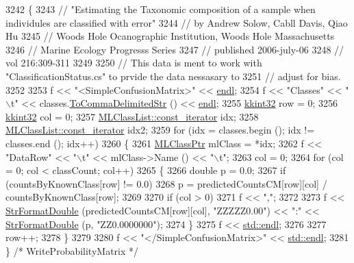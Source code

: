 \begin{DoxyCode}
3242 \{
3243   \textcolor{comment}{// "Estimating the Taxonomic composition of a sample when individules are classified with error"}
3244   \textcolor{comment}{// by Andrew Solow, Cabll Davis, Qiao Hu}
3245   \textcolor{comment}{// Woods Hole Ocanographic Institution, Woods Hole Massachusetts}
3246   \textcolor{comment}{// Marine Ecology Progresss Series}
3247   \textcolor{comment}{// published 2006-july-06}
3248   \textcolor{comment}{// vol 216:309-311}
3249   
3250   \textcolor{comment}{// This data is ment to work with "ClassificationStatus.cs" to prvide the data nessasary to }
3251   \textcolor{comment}{// adjust for bias.}
3252 
3253   f << \textcolor{stringliteral}{"<SimpleConfusionMatrix>"} << \hyperlink{namespace_k_k_b_ad1f50f65af6adc8fa9e6f62d007818a8}{endl};
3254   f << \textcolor{stringliteral}{"Classes"}      << \textcolor{stringliteral}{"\(\backslash\)t"} << classes.\hyperlink{class_k_k_m_l_l_1_1_m_l_class_list_a2842ee0f0a658c29988b02bf5cbe19d7}{ToCommaDelimitedStr} () << 
      \hyperlink{namespace_k_k_b_ad1f50f65af6adc8fa9e6f62d007818a8}{endl};
3255   \hyperlink{namespace_k_k_b_a8fa4952cc84fda1de4bec1fbdd8d5b1b}{kkint32}  row = 0;
3256   \hyperlink{namespace_k_k_b_a8fa4952cc84fda1de4bec1fbdd8d5b1b}{kkint32}  col = 0;
3257   \hyperlink{class_k_k_b_1_1_k_k_queue_aeb057c9c010446f46f57c1e355f981f1}{MLClassList::const\_iterator}  idx;
3258   \hyperlink{class_k_k_b_1_1_k_k_queue_aeb057c9c010446f46f57c1e355f981f1}{MLClassList::const\_iterator}  idx2;
3259   \textcolor{keywordflow}{for}  (idx = classes.begin ();  idx != classes.end ();  idx++)
3260   \{
3261     \hyperlink{class_k_k_m_l_l_1_1_m_l_class}{MLClassPtr}  mlClass = *idx;
3262     f << \textcolor{stringliteral}{"DataRow"} << \textcolor{stringliteral}{"\(\backslash\)t"} << mlClass->Name () << \textcolor{stringliteral}{"\(\backslash\)t"};
3263     col = 0;
3264     \textcolor{keywordflow}{for}  (col = 0;  col < classCount;  col++)
3265     \{
3266       \textcolor{keywordtype}{double} p = 0.0;
3267       \textcolor{keywordflow}{if}  (countsByKnownClass[row] != 0.0)
3268         p = predictedCountsCM[row][col] / countsByKnownClass[row];
3269 
3270       \textcolor{keywordflow}{if}  (col > 0)
3271         f << \textcolor{stringliteral}{","};
3272 
3273       f << \hyperlink{namespace_k_k_b_a1a40a40e955fa5417a7cdd990e0021b1}{StrFormatDouble} (predictedCountsCM[row][col], \textcolor{stringliteral}{"ZZZZZ0.00"}) << \textcolor{stringliteral}{":"} << 
      \hyperlink{namespace_k_k_b_a1a40a40e955fa5417a7cdd990e0021b1}{StrFormatDouble} (p, \textcolor{stringliteral}{"ZZ0.0000000"});
3274     \}
3275     f << \hyperlink{namespace_k_k_b_ad1f50f65af6adc8fa9e6f62d007818a8}{std::endl};
3276 
3277     row++;
3278   \}
3279 
3280   f << \textcolor{stringliteral}{"</SimpleConfusionMatrix>"} << \hyperlink{namespace_k_k_b_ad1f50f65af6adc8fa9e6f62d007818a8}{std::endl};
3281 \}  \textcolor{comment}{/* WriteProbabilityMatrix */}
\end{DoxyCode}
